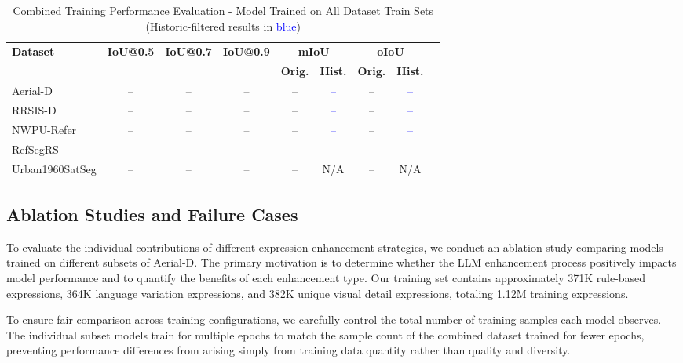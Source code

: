 \begin{table*}[t]
\centering
\caption{Combined Training Performance Evaluation - Model Trained on All Dataset Train Sets (Historic-filtered results in \textcolor{blue}{blue})}
\label{tab:combined_training_results}
\begin{tabular}{@{}lcccccccc@{}}
\toprule
\textbf{Dataset} & \textbf{IoU@0.5} & \textbf{IoU@0.7} & \textbf{IoU@0.9} & \multicolumn{2}{c}{\textbf{mIoU}} & \multicolumn{2}{c}{\textbf{oIoU}} \\
\cmidrule(lr){5-6} \cmidrule(lr){7-8}
 & & & & \textbf{Orig.} & \textbf{Hist.} & \textbf{Orig.} & \textbf{Hist.} \\
\midrule
Aerial-D & -- & -- & -- & -- & \textcolor{blue}{--} & -- & \textcolor{blue}{--} \\
RRSIS-D & -- & -- & -- & -- & \textcolor{blue}{--} & -- & \textcolor{blue}{--} \\
NWPU-Refer & -- & -- & -- & -- & \textcolor{blue}{--} & -- & \textcolor{blue}{--} \\
RefSegRS & -- & -- & -- & -- & \textcolor{blue}{--} & -- & \textcolor{blue}{--} \\
Urban1960SatSeg & -- & -- & -- & -- & N/A & -- & N/A \\
\bottomrule
\end{tabular}
\end{table*}


\subsection{Ablation Studies and Failure Cases}
\label{subsec:ablation_studies}

To evaluate the individual contributions of different expression enhancement strategies, we conduct an ablation study comparing models trained on different subsets of Aerial-D. The primary motivation is to determine whether the LLM enhancement process positively impacts model performance and to quantify the benefits of each enhancement type. Our training set contains approximately 371K rule-based expressions, 364K language variation expressions, and 382K unique visual detail expressions, totaling 1.12M training expressions.

To ensure fair comparison across training configurations, we carefully control the total number of training samples each model observes. The individual subset models train for multiple epochs to match the sample count of the combined dataset trained for fewer epochs, preventing performance differences from arising simply from training data quantity rather than quality and diversity.

